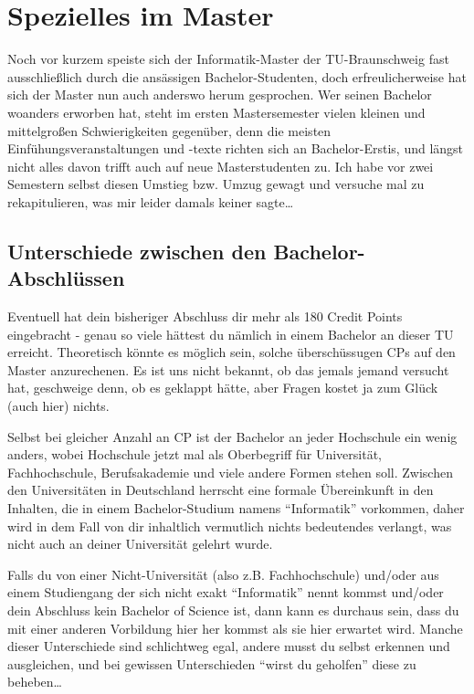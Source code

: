 \section{Spezielles im Master}
\begin{multicols}{2}
\label{master}


Noch vor kurzem speiste sich der Informatik-Master der TU-Braunschweig fast ausschließlich durch die ansässigen Bachelor-Studenten, doch erfreulicherweise hat sich der Master nun auch anderswo herum gesprochen. Wer seinen Bachelor woanders erworben hat, steht im ersten Mastersemester vielen kleinen und mittelgroßen Schwierigkeiten gegenüber, denn die meisten Einfühungsveranstaltungen und -texte richten sich an Bachelor-Erstis, und längst nicht alles davon trifft auch auf neue Masterstudenten zu. Ich habe vor zwei Semestern selbst diesen Umstieg bzw. Umzug gewagt und versuche mal zu rekapitulieren, was mir leider damals keiner sagte\ldots


\subsection{Unterschiede zwischen den Bachelor-Abschlüssen}
Eventuell hat dein bisheriger Abschluss dir mehr als 180 Credit Points eingebracht - genau so viele hättest du nämlich in einem Bachelor an dieser TU erreicht. Theoretisch könnte es möglich sein, solche überschüssugen CPs auf den Master anzurechenen. Es ist uns nicht bekannt, ob das jemals jemand versucht hat, geschweige denn, ob es geklappt hätte, aber Fragen kostet ja zum Glück (auch hier) nichts.

Selbst bei gleicher Anzahl an CP ist der Bachelor an jeder Hochschule ein wenig anders, wobei Hochschule jetzt mal als Oberbegriff für Universität, Fachhochschule, Berufsakademie und viele andere Formen stehen soll. Zwischen den Universitäten in Deutschland herrscht eine formale Übereinkunft in den Inhalten, die in einem Bachelor-Studium namens "`Informatik"' vorkommen, daher wird in dem Fall von dir inhaltlich vermutlich nichts bedeutendes verlangt, was nicht auch an deiner Universität gelehrt wurde.

Falls du von einer Nicht-Universität (also z.B. Fachhochschule) und/oder aus einem Studiengang der sich nicht exakt "`Informatik"' nennt kommst und/oder dein Abschluss kein Bachelor of Science ist, dann kann es durchaus sein, dass du mit einer anderen Vorbildung hier her kommst als sie hier erwartet wird. Manche dieser Unterschiede sind schlichtweg egal, andere musst du selbst erkennen und ausgleichen, und bei gewissen Unterschieden "`wirst du geholfen"' diese zu beheben\ldots


\end{multicols}
